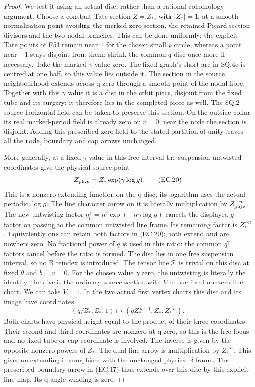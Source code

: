 \begin{proof}
We test it using an actual disc, rather than a rational cohomology
argument. Choose a constant Tate section \(Z=Z_*\), with
\(|Z_*|=1\), at a smooth normalization point avoiding the
marked zero section, the retained Picard-section divisors and
the two nodal branches. This can be done uniformly: the explicit
Tate points of F54 remain near \(1\) for the chosen small \(\rho\)
circle, whereas a point near \(-1\) stays disjoint from them;
shrink the common q disc once more if necessary. Take the marked \(\gamma\)
value zero. The fixed graph's short arc in SQ.4c is centred at
one half, so this value lies outside it. The section in the
source neighbourhood extends across q zero through a smooth
point of the nodal fibre. Together with this \(\gamma\) value it is
a disc in the orbit piece, disjoint from the fixed tube and its
surgery; it therefore lies in the completed piece as well.
The SQ.2 source horizontal field can be taken to preserve this
section. On the outside collar its real marked-period field is
already zero on \(v=0\); near the node the section is disjoint.
Adding this prescribed zero field to the stated partition of
unity leaves all the node, boundary and cap arrows unchanged.

More generally, at a fixed \(\gamma\) value in this free interval the
suspension-untwisted coordinates give the physical source point
\[
             Z_{\rm phys}=Z_*\exp(\gamma\log g).
                                                        \tag{EC.20}
\]
This is a nonzero extending function on the q disc; its logarithm
uses the actual periodic \(\log g\). The line character arrow
on it is literally multiplication by \(Z_{\rm phys}^{-n}\).
The new untwisting factor
\(\eta_n^\gamma=\eta^\gamma\exp(-n\gamma\log g)\)
cancels the displayed \(g\) factor on passing to the common
untwisted line frame. Its remaining factor is \(Z_*^{-n}\).
Equivalently one can retain both factors in (EC.20); both extend
and are nowhere zero. No fractional power of \(q\) is used in
this ratio: the common \(q^\gamma\) factors cancel before the
ratio is formed. The disc lies in one free suspension interval,
so no B reindex is introduced. The tensor line \(\mathcal T\)
is trivial on this disc at fixed \(\theta\) and \(b=v=0\).
For the chosen value \(\gamma\) zero, the untwisting is literally the
identity: the disc is the ordinary source section with \(V\) in
one fixed nonzero line chart. We can take \(V=1\). In the two
actual first vertex charts this disc and its image have coordinates
\[
 (q/Z_*,Z_*,1)\longmapsto
                 (qZ_*^{\,n-1},Z_*,Z_*^{-n}).
                                                        \tag{EC.20a}
\]
Both charts have physical height equal to the product of their
three coordinates. Their second and third coordinates are nonzero
at q zero, so this is the free locus and no fixed-tube or cap
coordinate is involved. The inverse is given by the opposite
nonzero powers of \(Z_*\). The dual line arrow is multiplication
by \(Z_*^{-n}\). This gives an extending isomorphism
with the unchanged physical \(\delta\) frame. The prescribed boundary
arrow in (EC.17) thus extends over this disc by this explicit line
map. Its q-angle winding is zero.


\end{proof}
